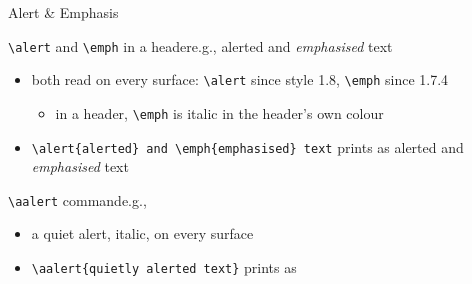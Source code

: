 \begin{frame}[c,fragile]{Alert \& Emphasis}
%
\begin{block}{\texttt{\textbackslash{}alert} and \texttt{\textbackslash{}emph} in a header\textemdash{}e.g., \alert{alerted} and \emph{emphasised} text}
\begin{itemize}
	\item both read on every surface: \texttt{\textbackslash{}alert} since style 1.8, \texttt{\textbackslash{}emph} since 1.7.4
	\begin{itemize}
		\item in a header, \texttt{\textbackslash{}emph} is italic in the header's own colour
	\end{itemize}
	\item[e.g.] \verb|\alert{alerted} and \emph{emphasised} text| prints as \alert{alerted} and \emph{emphasised} text
\end{itemize}
\end{block}
%
\begin{block}{\texttt{\textbackslash{}aalert} command\textemdash{}e.g., }
\begin{itemize}
	\item a quiet alert, italic, on every surface
	\item[e.g.] \verb|| prints as \aalert{quietly alerted text}
\end{itemize}
\end{block}
%
\end{frame}
